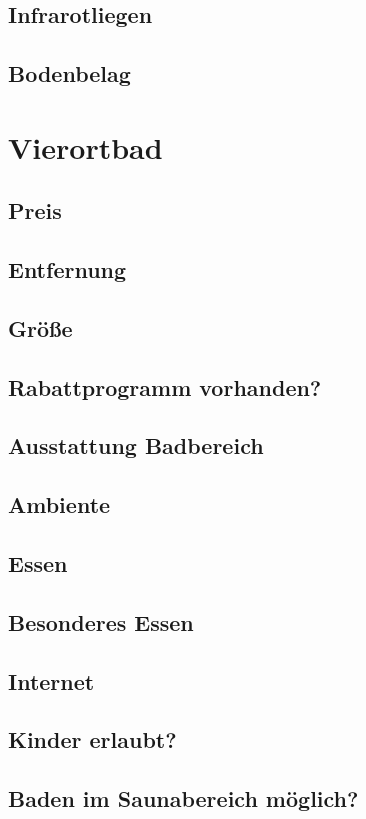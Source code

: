 \documentclass{article}
\begin{document}
\subsection*{Infrarotliegen}
\subsection*{Bodenbelag}

\section*{Vierortbad}
\subsection*{Preis}
\subsection*{Entfernung}
\subsection*{Größe}
\subsection*{Rabattprogramm vorhanden?}
\subsection*{Ausstattung Badbereich}
\subsection*{Ambiente}
\subsection*{Essen}
\subsection*{Besonderes Essen}
\subsection*{Internet}
\subsection*{Kinder erlaubt?}
\subsection*{Baden im Saunabereich möglich?}
\end{document}
